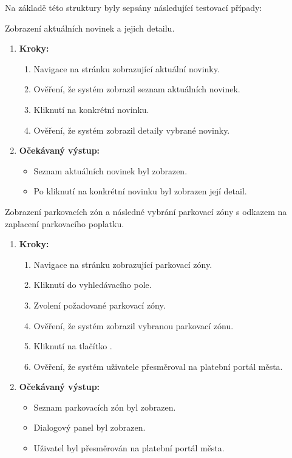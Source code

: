 \medskip

Na základě této struktury byly sepsány následující testovací případy:


Zobrazení aktuálních novinek a jejich detailu.

\begin{enumerate}
  \item \textbf{Kroky:}
    \begin{enumerate}
      \item Navigace na stránku zobrazující aktuální novinky.
      \item Ověření, že systém zobrazil seznam aktuálních novinek.
      \item Kliknutí na konkrétní novinku.
      \item Ověření, že systém zobrazil detaily vybrané novinky.
    \end{enumerate}
  \item \textbf{Očekávaný výstup:}
    \begin{itemize}
      \item Seznam aktuálních novinek byl zobrazen.
      \item Po kliknutí na konkrétní novinku byl zobrazen její detail.
    \end{itemize}
\end{enumerate}

Zobrazení parkovacích zón a následné vybrání parkovací zóny s odkazem na zaplacení parkovacího poplatku.

\begin{enumerate}
  \item \textbf{Kroky:}
    \begin{enumerate}
      \item Navigace na stránku zobrazující parkovací zóny.
      \item Kliknutí do vyhledávacího pole.
      \item Zvolení požadované parkovací zóny.
      \item Ověření, že systém zobrazil vybranou parkovací zónu.
      \item Kliknutí na tlačítko .
      \item Ověření, že systém uživatele přesměroval na platební portál města.
    \end{enumerate}
  \item \textbf{Očekávaný výstup:}
    \begin{itemize}
      \item Seznam parkovacích zón byl zobrazen.
      \item Dialogový panel byl zobrazen.
      \item Uživatel byl přesměrován na platební portál města.
    \end{itemize}
\end{enumerate}

